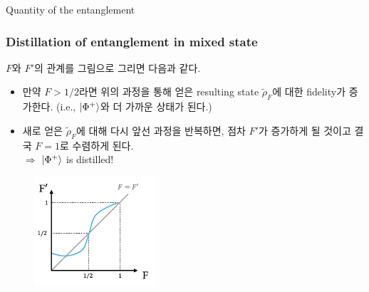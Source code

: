 \documentclass[9pt]{beamer}
\begin{document}
\begin{section}{Quantity of the entanglement}
        \begin{frame}
            \frametitle{Distillation of entanglement in mixed state}
            $F$와 $F'$의 관계를 그림으로 그리면 다음과 같다. 
            \begin{itemize}
                \item 만약 $F>1/2$라면 위의 과정을 통해 얻은 resulting state $\tilde \rho_F$에 대한 fidelity가 증가한다. (i.e., $\ket{\Phi^+}$와 더 가까운 상태가 된다.)
                \item 새로 얻은 $\tilde \rho_F$에 대해 다시 앞선 과정을 반복하면, 점차 $F'$가 증가하게 될 것이고 결국 $F=1$로 수렴하게 된다.
                \\$\Rightarrow$ $\ket{\Phi^+}$ is distilled!
            \end{itemize}
            \vspace{0.2cm}
            \begin{figure}
                \centering
                \includegraphics[width=0.4\textwidth]{image/L7_graph.png}
            \end{figure}
        \end{frame}
    \end{section}
\end{document}
